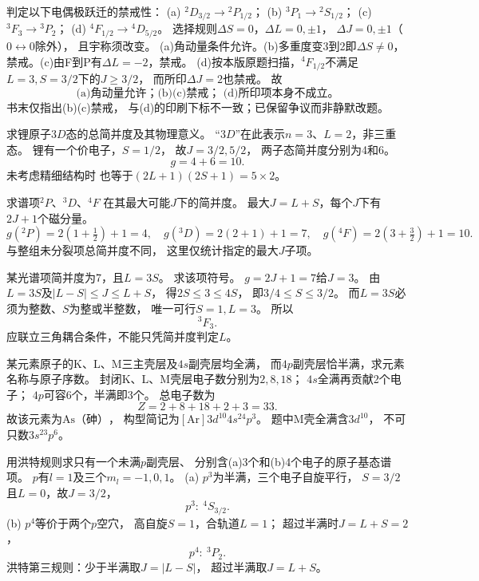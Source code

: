 判定以下电偶极跃迁的禁戒性：
(a) \({}^{2}D_{3/2}\to{}^{2}P_{1/2}\)；
(b) \({}^{3}P_1\to{}^{2}S_{1/2}\)；
(c) \({}^{3}F_3\to{}^{3}P_2\)；
(d) \({}^{4}F_{1/2}\to{}^{4}D_{5/2}\)。
\exsolution
选择规则$\Delta S=0$，$\Delta L=0,\pm1$，
$\Delta J=0,\pm1$（$0\leftrightarrow0$除外），
且宇称须改变。
(a)角动量条件允许。(b)多重度变3到2即$\Delta S\ne0$，
禁戒。(c)由F到P有$\Delta L=-2$，禁戒。
(d)按本版原题扫描，\({}^{4}F_{1/2}\)不满足
$L=3,S=3/2$下的$J\ge3/2$，
而所印$\Delta J=2$也禁戒。
故
\[
 \boxed{\text{(a)角动量允许；(b)(c)禁戒；
 (d)所印项本身不成立。}}
\]
\excheck 书末仅指出(b)(c)禁戒，
与(d)的印刷下标不一致；已保留争议而非静默改题。

求锂原子$3D$态的总简并度及其物理意义。
\exsolution
“$3D$”在此表示$n=3$、$L=2$，非三重态。
锂有一个价电子，$S=1/2$，
故$J=3/2,5/2$，
两子态简并度分别为4和6。
\[
 \boxed{g=4+6=10}.
\]
\excheck 未考虑精细结构时
也等于$(2L+1)(2S+1)=5\times2$。

求谱项\({}^{2}P\)、\({}^{3}D\)、\({}^{4}F\)
在其最大可能$J$下的简并度。
\exsolution
最大$J=L+S$，每个$J$下有$2J+1$个磁分量。
\[
 \boxed{g({}^{2}P)=2(1+\tfrac12)+1=4},\quad
 \boxed{g({}^{3}D)=2(2+1)+1=7},\quad
 \boxed{g({}^{4}F)=2(3+\tfrac32)+1=10}.
\]
\excheck 与整组未分裂项总简并度不同，
这里仅统计指定的最大$J$子项。

某光谱项简并度为7，且$L=3S$。
求该项符号。
\exsolution
$g=2J+1=7$给$J=3$。
由$L=3S$及$|L-S|\le J\le L+S$，
得$2S\le3\le4S$，
即$3/4\le S\le3/2$。
而$L=3S$必须为整数、$S$为整或半整数，
唯一可行$S=1,L=3$。
所以
\[
 \boxed{{}^{3}F_3}.
\]
\excheck 应联立三角耦合条件，不能只凭简并度判定$L$。

某元素原子的K、L、M三主壳层及$4s$副壳层均全满，
而$4p$副壳层恰半满，求元素名称与原子序数。
\exsolution
封闭K、L、M壳层电子数分别为$2,8,18$；
$4s$全满再贡献2个电子；
$4p$可容6个，半满即3个。
总电子数为
\[
 Z=2+8+18+2+3=\boxed{33}.
\]
故该元素为$\boxed{\mathrm{As}\text{（砷）}}$，
构型简记为$[\mathrm{Ar}]3d^{10}4s^24p^3$。
\excheck 题中M壳全满含$3d^{10}$，
不可只数$3s^23p^6$。

用洪特规则求只有一个未满$p$副壳层、
分别含(a)3个和(b)4个电子的原子基态谱项。
\exsolution
$p$有$l=1$及三个$m_l=-1,0,1$。
(a) $p^3$为半满，三个电子自旋平行，
$S=3/2$且$L=0$，故$J=3/2$，
\[
 \boxed{p^3:\ {}^{4}S_{3/2}}.
\]
(b) $p^4$等价于两个$p$空穴，
高自旋$S=1$，合轨道$L=1$；
超过半满时$J=L+S=2$，
\[
 \boxed{p^4:\ {}^{3}P_2}.
\]
\excheck 洪特第三规则：少于半满取$J=|L-S|$，
超过半满取$J=L+S$。

